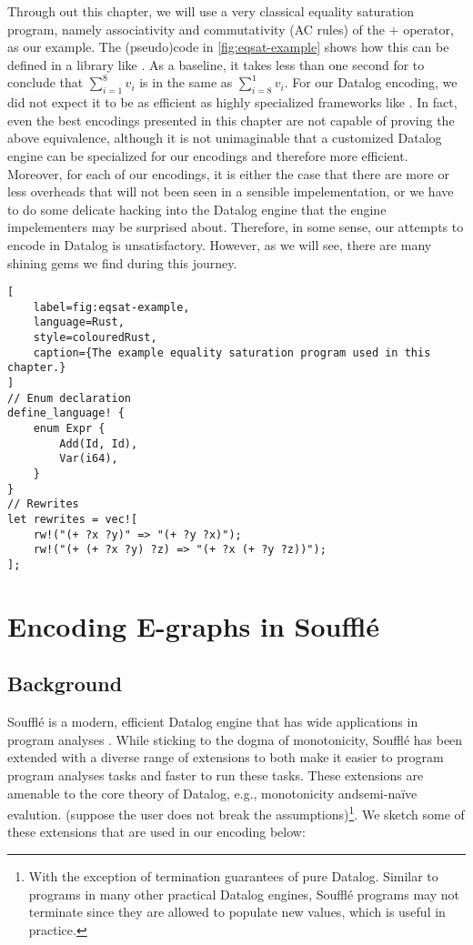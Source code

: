 Through out this chapter, we will use a very classical equality saturation program,
 namely associativity and commutativity (AC rules) of the $+$ operator, as our example.
The (pseudo)code in \autoref{fig:eqsat-example} shows how this can be defined in a library like \egg.
As a baseline, it takes less than one second for \egg to conclude that
 $\sum_{i=1}^{8}v_i$ is in the same \eclass as $\sum_{i=8}^{1}v_i$.
For our Datalog encoding,
 we did not expect it to be as efficient as highly specialized \egraph frameworks like \egg.
In fact, even the best encodings presented in this chapter
 are not capable of proving the above equivalence,
 although it is not unimaginable that a customized Datalog engine can be specialized
 for our \egraph encodings and therefore more efficient.
Moreover,
 for each of our encodings,
 it is either the case that there are more or less overheads 
 that will not been seen in a sensible \egraph impelementation,
 or we have to do some delicate hacking into the Datalog engine that 
 the engine impelementers may be surprised about.
Therefore, in some sense,
 our attempts to encode \egraphs in Datalog is unsatisfactory.
However, 
 as we will see,
 there are many shining gems we find during this journey.

\begin{lstlisting}[
    label=fig:eqsat-example,
    language=Rust, 
    style=colouredRust, 
    caption={The example equality saturation program used in this chapter.}
]
// Enum declaration
define_language! {
    enum Expr {
        Add(Id, Id),
        Var(i64),
    }
}
// Rewrites
let rewrites = vec![
    rw!("(+ ?x ?y)" => "(+ ?y ?x)");
    rw!("(+ (+ ?x ?y) ?z) => "(+ ?x (+ ?y ?z))");
];
\end{lstlisting}

\section{Encoding E-graphs in Souffl\'e}

\subsection{Background}

Souffl\'e is a modern, efficient Datalog engine 
 that has wide applications in program analyses \citep{doop, souffle, souffle-interpreter}.
While sticking to the dogma of monotonicity, 
 Souffl\'e has been extended with a diverse range of extensions
 to both make it easier to program program analyses tasks
 and faster to run these tasks.
These extensions are amenable to the core theory of Datalog,
 e.g., monotonicity andsemi-na\"ive evalution.
 (suppose the user does not break the assumptions)\footnote{With the exception
 of termination guarantees of pure Datalog. 
 Similar to programs in many other practical Datalog engines, 
 Souffl\'e programs may not terminate
 since they are allowed to populate new values, which is useful in practice.}.
We sketch some of these extensions that are used in our encoding below:

